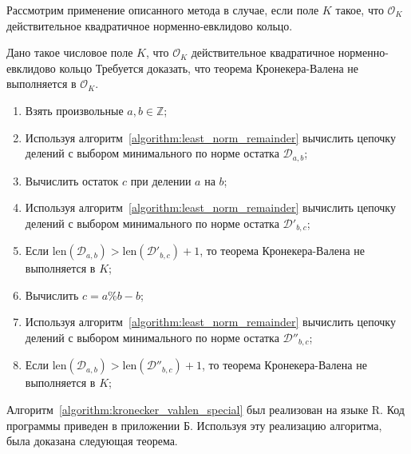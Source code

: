 \documentclass[_00_dissertation.tex]{subfiles}
\begin{document}

Рассмотрим применение описанного метода в случае, если поле $K$ такое, что $\mathcal{O}_K$ действительное квадратичное норменно-евклидово кольцо.

\begin{algorithm}\label{algorithm:kronecker_vahlen_special}
    Дано такое числовое поле $K$, что $\mathcal{O}_K$ действительное квадратичное норменно-евклидово кольцо
    Требуется доказать, что теорема Кронекера-Валена не выполняется в $\mathcal{O}_K$.

    \begin{enumerate}
        \item Взять произвольные $a, b \in \mathbb{Z}$;

        \item Используя алгоритм~\ref{algorithm:least_norm_remainder} вычислить цепочку делений с выбором минимального по норме остатка $\mathcal{D}_{a,b}$;

        \item Вычислить остаток $c$ при делении $a$ на $b$;

        \item Используя алгоритм~\ref{algorithm:least_norm_remainder} вычислить цепочку делений с выбором минимального по норме остатка $\mathcal{D}'_{b, c}$;

        \item Если $\textrm{len}(\mathcal{D}_{a, b}) > \textrm{len}(\mathcal{D}'_{b, c}) + 1$, то теорема Кронекера-Валена не выполняется в $K$;

        \item Вычислить $c = a \% b - b$;

        \item Используя алгоритм~\ref{algorithm:least_norm_remainder} вычислить цепочку делений с выбором минимального по норме остатка $\mathcal{D}''_{b,c}$;

        \item Если $\textrm{len}(\mathcal{D}_{a, b}) > \textrm{len}(\mathcal{D}''_{b, c}) + 1$, то теорема Кронекера-Валена не выполняется в $K$;
    \end{enumerate}
\end{algorithm}

Алгоритм~\ref{algorithm:kronecker_vahlen_special} был реализован на языке R.
Код программы приведен в приложении Б.
Используя эту реализацию алгоритма, была доказана следующая теорема.
\end{document}
